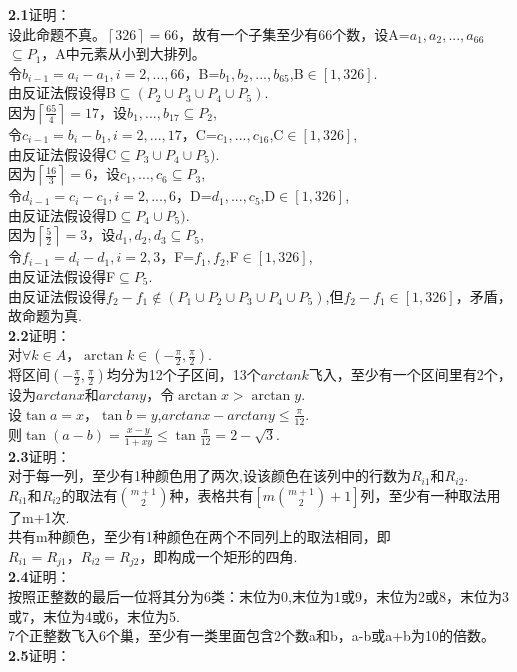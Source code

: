 \documentclass{article}
\begin{document}
\linespread{1.5}
\begin{center}
    \Large{}
\end{center}
\textbf{2.1}证明：\\
设此命题不真。\(\left \lceil 326 \right \rceil =66\)，故有一个子集至少有66个数，设A={\(a_{1},a_{2},...,a_{66}\)}\(\subseteq P_{1}\)，A中元素从小到大排列。\\
令\(b_{i-1}= a_{i}-a_{1},i=2,...,66\)，B={\(b_{1},b_{2},...,b_{65}\)},B\(\in [1,326]\).\\
由反证法假设得B\(\subseteq (P_{2}\cup P_{3}\cup P_{4}\cup P_{5} )\).\\
因为\(\left \lceil \frac{65}{4} \right \rceil =17\)，设\({b_{1},...,b_{17}}\subseteq P_{2}\),\\
令\(c_{i-1}= b_{i}-b_{1},i=2,...,17\)，C={\(c_{1},...,c_{16}\)},C\(\in [1,326]\),\\
由反证法假设得C\(\subseteq P_{3}\cup P_{4}\cup P_{5} )\).\\
因为\(\left \lceil \frac{16}{3} \right \rceil =6\)，设\({c_{1},...,c_{6}}\subseteq P_{3}\),\\
令\(d_{i-1}= c_{i}-c_{1},i=2,...,6\)，D={\(d_{1},...,c_{5}\)},D\(\in [1,326]\),\\
由反证法假设得D\(\subseteq P_{4}\cup P_{5} )\).\\
因为\(\left \lceil \frac{5}{2} \right \rceil =3\)，设\({d_{1},d_{2},d_{3}}\subseteq P_{5}\),\\
令\(f_{i-1}= d_{i}-d_{1},i=2,3\)，F={\(f_{1},f_{2}\)},F\(\in [1,326]\),\\
由反证法假设得F\(\subseteq P_{5}\).\\
由反证法假设得\(f_{2}-f_{1} \notin (P_{1} \cup P_{2}\cup P_{3}\cup P_{4}\cup P_{5})\),但\(f_{2}-f_{1} \in [1,326]\)，矛盾，故命题为真.\\
\textbf{2.2}证明：\\
对\(\forall k\in A\)，\(\arctan k\in (-\frac{\pi}{2},\frac{\pi}{2})\).\\
将区间\((-\frac{\pi}{2},\frac{\pi}{2})\)均分为12个子区间，13个\(arctan k\)飞入，至少有一个区间里有2个，设为\(arctan x\)和\(arctan y\)，令\(\arctan x>\arctan y\).\\
设\(\tan a=x\)，\(\tan b=y\),\(arctan x-arctan y\le \frac{\pi }{12} \).\\
则\(\tan(a-b)=\frac{x-y}{1+xy}\le \tan\frac{\pi }{12}=2-\sqrt{3}\).\\
\textbf{2.3}证明：\\
对于每一列，至少有1种颜色用了两次,设该颜色在该列中的行数为\(R_{i1}和R_{i2} \). \\
\(R_{i1}和R_{i2}\)的取法有\(\binom{m+1}{2}\)种，表格共有\([m\binom{m+1}{2}+1]\)列，至少有一种取法用了m+1次.\\
共有m种颜色，至少有1种颜色在两个不同列上的取法相同，即\(R_{i1}=R_{j1}，R_{i2}=R_{j2}\)，即构成一个矩形的四角.\\
\textbf{2.4}证明：\\
按照正整数的最后一位将其分为6类：{末位为0},{末位为1或9}，{末位为2或8}，{末位为3或7}，{末位为4或6}，{末位为5}.\\
7个正整数飞入6个巢，至少有一类里面包含2个数a和b，a-b或a+b为10的倍数。\\
\textbf{2.5}证明：\\
\end{document}
